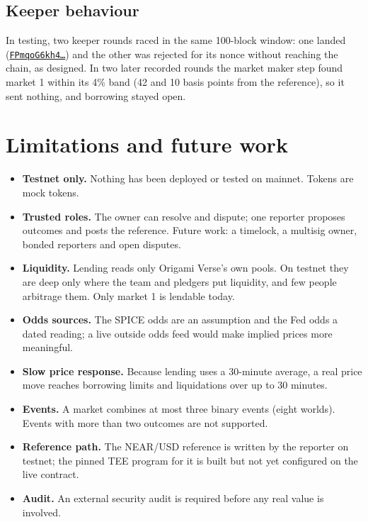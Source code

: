 \documentclass[11pt,a4paper]{article}
\newcommand{\code}[1]{\texttt{\small #1}}
\newcommand{\tx}[2]{\href{https://testnet.nearblocks.io/txns/#1}{\code{#2\ldots}}}
\begin{document}
\subsection{Keeper behaviour}

In testing, two keeper rounds raced in the same 100-block window: one landed
(\tx{FPmqoG6kh4mcRr8gn3b5xZ7ixQK4HreTRKuYSDw63XPt}{FPmqoG6kh4}) and the other was rejected for its nonce without reaching
the chain, as designed. In two later recorded rounds the market maker step found market 1 within its 4\% band
(42 and 10 basis points from the reference), so it sent nothing, and borrowing stayed open.

\section{Limitations and future work}
\label{sec:limits}

\begin{itemize}
\item \textbf{Testnet only.} Nothing has been deployed or tested on mainnet. Tokens are mock tokens.
\item \textbf{Trusted roles.} The owner can resolve and dispute; one reporter proposes outcomes and posts the
reference. Future work: a timelock, a multisig owner, bonded reporters and open disputes.
\item \textbf{Liquidity.} Lending reads only Origami Verse's own pools. On testnet they are deep only where the team and
pledgers put liquidity, and few people arbitrage them. Only market 1 is lendable today.
\item \textbf{Odds sources.} The SPICE odds are an assumption and the Fed odds a dated reading; a live outside odds
feed would make implied prices more meaningful.
\item \textbf{Slow price response.} Because lending uses a 30-minute average, a real price move reaches borrowing
limits and liquidations over up to 30 minutes.
\item \textbf{Events.} A market combines at most three binary events (eight worlds). Events with more than two outcomes
are not supported.
\item \textbf{Reference path.} The NEAR/USD reference is written by the reporter on testnet; the pinned TEE program for
it is built but not yet configured on the live contract.
\item \textbf{Audit.} An external security audit is required before any real value is involved.
\end{itemize}
\end{document}
